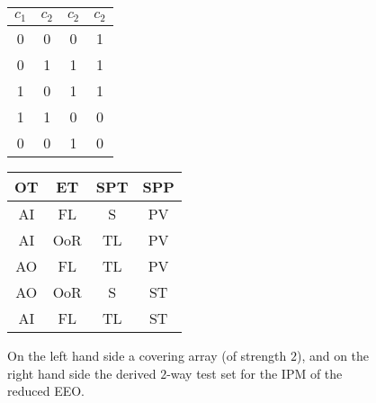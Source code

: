 \documentclass[runningheads]{llncs}
\begin{document}
\begin{figure}[t]
	\begin{multicols}{2}
	\begin{center}
\begin{tabular}{cccc}
$c_1$ & $c_2$ & $c_2$ & $c_2$ \\
\hline
0 & 0 & 0 & 1 \\
0 & 1 & 1 & 1 \\
1 & 0 & 1 & 1 \\
1 & 1 & 0 & 0 \\
0 & 0 & 1 & 0
\end{tabular}
\end{center}

\begin{center}
\begin{tabular}{cccc}
OT & ET & SPT & SPP \\
\hline
AI & FL & S & PV \\
AI & OoR  & TL & PV \\
AO & FL & TL & PV \\
AO & OoR  & S & ST \\
AI & FL & TL & ST
\end{tabular}
\end{center}
\end{multicols}
\vspace{-.3cm}
  \caption{On the left hand side a covering array (of strength $2$),
    and on the right hand side the derived $2$-way test set for the IPM of the reduced EEO.}
		\label{tab:TestSuite}
\end{figure}
\end{document}
